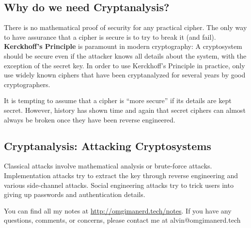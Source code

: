 \documentclass{math}
\begin{document}
\subsection*{Why do we need Cryptanalysis?}
There is no mathematical proof of security for any practical cipher. The only
way to have assurance that a cipher is secure is to try to break it (and fail).
\textbf{Kerckhoff's Principle} is paramount in modern cryptography: A
cryptosystem should be secure even if the attacker knows all details about the
system, with the exception of the secret key. In order to use Kerckhoff's
Principle in practice, only use widely known ciphers that have been
cryptanalyzed for several years by good cryptographers.
\par It is tempting to assume that a cipher is ``more secure'' if its details
are kept secret. However, history has shown time and again that secret ciphers
can almost always be broken once they have been reverse engineered.

\subsection*{Cryptanalysis: Attacking Cryptosystems}
Classical attacks involve mathematical analysis or brute-force attacks.
Implementation attacks try to extract the key through reverse engineering
and various side-channel attacks. Social engineering attacks try to trick
users into giving up passwords and authentication details.

\begin{center}
  You can find all my notes at \url{http://omgimanerd.tech/notes}. If you have
  any questions, comments, or concerns, please contact me at
  alvin@omgimanerd.tech
\end{center}
\end{document}
